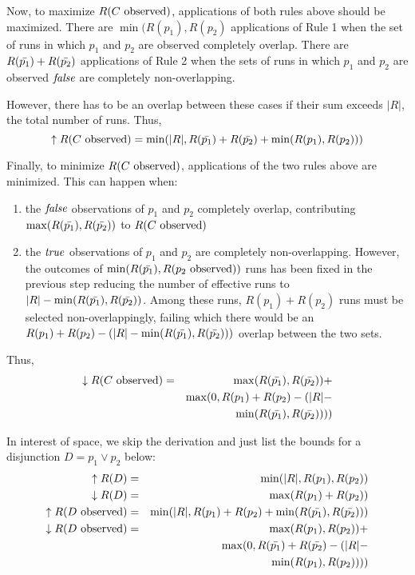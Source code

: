Now, to maximize $R(\text{$C$ observed})$, applications of both rules above should be
maximized.
There are $\min(R(p_1), R(p_2)$ applications of Rule 1 when the set 
of runs in which $p_1$ and $p_2$ are observed completely overlap.
There are $R(\text{$\bar{p_1}$}) + R(\text{$\bar{p_2}$})$ applications of Rule
2 when the sets of runs in which $p_1$ and $p_2$ are observed $\mathit{false}$ are
completely non-overlapping.

However, there has to be an overlap between these cases if their sum exceeds 
$|R|$, the total number of runs.  Thus,
\begin{equation}
  \uparrow R(\text{$C$ observed}) = \min(|R|, R(\text{$\bar{p_1}$}) + R(\text{$\bar{p_2}$})
                   + \min(R(p_1), R(p_2)))
\end{equation}

Finally, to minimize $R(\text{$C$ observed})$, applications of the two rules above are 
minimized.  This can happen when:
\begin{enumerate}
\item the $\mathit{false}$ observations of $p_1$ and $p_2$ completely overlap, contributing
$\max(R(\text{$\bar{p_1}$}), R(\text{$\bar{p_2}$}))$ to $R(\text{$C$ observed})$
\item the $\mathit{true}$ observations of $p_1$ and $p_2$ are completely non-overlapping.
However, the outcomes of $\min(R(\text{$\bar{p_1}$}), R(\text{$p_2$ observed}))$ runs has
been fixed in the previous step reducing the number of effective runs to
$|R| - \min(R(\text{$\bar{p_1}$}), R(\text{$\bar{p_2}$}))$.  Among these runs, $R(p_1) + R(p_2)$
runs must be selected non-overlappingly, failing which there would be an
$R(p_1) + R(p_2) - (|R| - \min(R(\text{$\bar{p_1}$}), R(\text{$\bar{p_2}$})))$ overlap
between the two sets.
\end{enumerate}

Thus,
\begin{eqnarray*}
  \downarrow R(\text{$C$ observed}) &=& \max(R(\text{$\bar{p_1}$}), R(\text{$\bar{p_2}$})) + \\
            & & \max(0, R(p_1) + R(p_2) - (|R| - \\
            & & \min(R(\text{$\bar{p_1}$}), R(\text{$\bar{p_2}$}))))
\end{eqnarray*}

In interest of space, we skip the derivation and just list the bounds for a
disjunction $D = p_1 \vee p_2$ below:
\begin{eqnarray*}
  \uparrow R(D) &=& \min(|R|, R(p_1), R(p_2)) \\
  \downarrow R(D) &=& \max(R(p_1) + R(p_2)) \\
  \uparrow R(\text{$D$ observed}) &=& \min(|R|, R(p_1) + R(p_2)
                   + \min(R(\text{$\bar{p_1}$}), R(\text{$\bar{p_2}$}))) \\
  \downarrow R(\text{$D$ observed}) &=& \max(R(p_1), R(p_2)) + \\
            & & \max(0, R(\text{$\bar{p_1}$}) + R(\text{$\bar{p_2}$}) - (|R| - \\
            & & \min(R(p_1), R(p_2))))
\end{eqnarray*}

